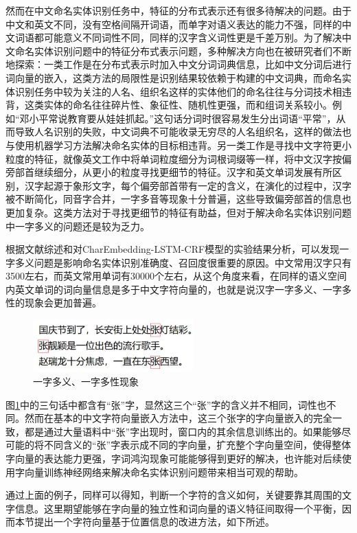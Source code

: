 \documentclass[winfonts,master,oneside,nobackinfo]{njuthesis}
\begin{document}
然而在中文命名实体识别任务中，特征的分布式表示还有很多待解决的问题。由于中文和英文不同，没有空格间隔开词语，而单字对语义表达的能力不强，同样的中文词语都可能意义不同词性不同，同样的汉字含义词性更是千差万别。为了解决中文命名实体识别问题中的特征分布式表示问题，多种解决方向也在被研究者们不断地探索：一类工作是在分布式表示时加入中文分词词典信息，比如中文分词后进行词向量的嵌入，这类方法的局限性是识别结果较依赖于构建的中文词典，而命名实体识别任务中较为关注的人名、组织名这样的实体他们的命名往往与分词技术相违背，这类实体的命名往往碎片性、象征性、随机性更强，而和组词关系较小。例如“邓小平常说教育要从娃娃抓起。”这句话分词时很容易发生分出词语“平常”，从而导致人名识别的失败，中文词典不可能收录无穷尽的人名组织名，这样的做法也与使用机器学习方法解决命名实体的目标相违背。另一类工作是寻找中文字符更小粒度的特征，就像英文工作中将单词粒度细分为词根词缀等一样，将中文汉字按偏旁部首继续细分，从更小的粒度寻找更细节的特征。汉字和英文单词发展有所区别，汉字起源于象形文字，每个偏旁部首带有一定的含义，在演化的过程中，汉字被不断简化，同音字合并，一字多音等现象十分普遍，这些导致偏旁部首的信息也更加复杂。这类方法对于寻找更细节的特征有助益，但对于解决命名实体识别问题中一字多义的问题还是较为乏力。

根据文献综述和对CharEmbedding-LSTM-CRF模型的实验结果分析，可以发现一字多义问题是影响命名实体识别准确度、召回度很重要的原因。中文常用汉字只有3500左右，而英文常用单词有30000个左右，从这个角度来看，在同样的语义空间内英文单词的词向量信息是多于中文字符向量的，也就是说汉字一字多义、一字多性的现象会更加普遍。

\begin{figure}[ht]
\centering
\includegraphics[width=0.55\textwidth]{./figure/一字多义.jpg}
\caption{一字多义、一字多性现象}
\label{one2many}
\end{figure}

图\ref{one2many}中的三句话中都含有“张”字，显然这三个“张”字的含义并不相同，词性也不同。然而在基本的中文字符向量嵌入方法中，这三个张字的字向量嵌入的完全一致，都是通过大量语料中“张”字出现时，窗口内的其余信息训练出的。如果能够尽可能的将不同含义的“张”字表示成不同的字向量，扩充整个字向量空间，使得整体字向量的表达能力更强，字词鸿沟现象可能能够得到更好的解决，也许能对后续使用字向量训练神经网络来解决命名实体识别问题带来相当可观的帮助。

通过上面的例子，同样可以得知，判断一个字符的含义如何，关键要靠其周围的文字信息。这里期望能够在字向量的独立性和词向量的语义特征间取得一个平衡，因而本节提出一个字符向量基于位置信息的改进方法，如下所述。
\end{document}
